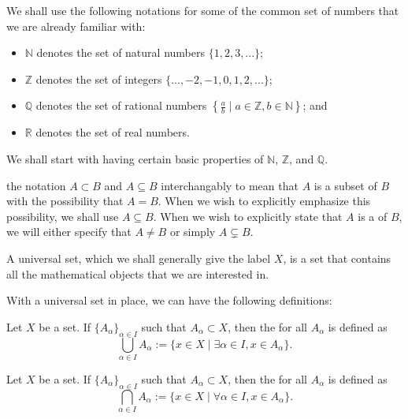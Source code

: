\documentclass[notoc,notitlepage]{tufte-book}
\begin{document}
We shall use the following notations for some of the common set of numbers that we are already familiar with:
\begin{itemize}
  \item $\mathbb{N}$ denotes the set of natural numbers $\{1, 2, 3, ...\}$;
  \item $\mathbb{Z}$ denotes the set of integers $\{..., -2, -1, 0, 1, 2, ...\}$;
  \item $\mathbb{Q}$ denotes the set of rational numbers $\left\{ \frac{a}{b} \mid a \in \mathbb{Z}, b \in \mathbb{N} \right\}$; and
  \item $\mathbb{R}$ denotes the set of real numbers.
\end{itemize}

We shall start with having certain basic properties of $\mathbb{N}$, $\mathbb{Z}$, and $\mathbb{Q}$.

 the notation $A \subset B$ and $A \subseteq B$ interchangably to mean that $A$ is a subset of $B$ with the possibility that $A = B$. When we wish to explicitly emphasize this possibility, we shall use $A \subseteq B$. When we wish to explicitly state that $A$ is a  of $B$, we will either specify that $A \neq B$ or simply $A \subsetneq B$.

\begin{defn}
\label{defn:universal_set}
  A universal set, which we shall generally give the label $X$, is a set that contains all the mathematical objects that we are interested in.
\end{defn}

With a universal set in place, we can have the following definitions:

\begin{defn}[Union]
\label{defn:union}
  Let $X$ be a set. If $\{A_\alpha\}_{\alpha \in I}$ such that $A_{\alpha} \subset X$, then the  for all $A_{\alpha}$ is defined as
  \begin{equation*}
    \bigcup_{\alpha \in I} A_{\alpha} := \{ x \in X \mid \exists \alpha \in I, x \in A_{\alpha} \}.
  \end{equation*}
\end{defn}

\begin{defn}[Intersection]
\label{defn:intersection}
  Let $X$ be a set. If $\{A_\alpha\}_{\alpha \in I}$ such that $A_\alpha \subset X$, then the  for all $A_\alpha$ is defined as
  \begin{equation*}
    \bigcap_{\alpha \in I} A_\alpha := \{ x \in X \mid \forall \alpha \in I, x \in A_\alpha \}.
  \end{equation*}
\end{defn}
\end{document}
